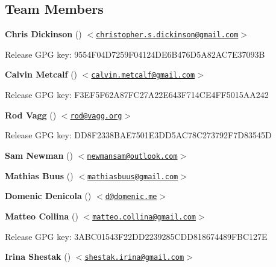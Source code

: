 \label{_members}%
 \subsection*{Team Members}


\begin{DoxyItemize}
\item {\bfseries Chris Dickinson} (\href{https://github.com/chrisdickinson}{\tt }) $<$\href{mailto:christopher.s.dickinson@gmail.com}{\tt christopher.\+s.\+dickinson@gmail.\+com}$>$
\begin{DoxyItemize}
\item Release G\+PG key\+: 9554\+F04\+D7259\+F04124\+D\+E6\+B476\+D5\+A82\+A\+C7\+E37093B
\end{DoxyItemize}
\item {\bfseries Calvin Metcalf} (\href{https://github.com/calvinmetcalf}{\tt }) $<$\href{mailto:calvin.metcalf@gmail.com}{\tt calvin.\+metcalf@gmail.\+com}$>$
\begin{DoxyItemize}
\item Release G\+PG key\+: F3\+E\+F5\+F62\+A87\+F\+C27\+A22\+E643\+F714\+C\+E4\+F\+F5015\+A\+A242
\end{DoxyItemize}
\item {\bfseries Rod Vagg} (\href{https://github.com/rvagg}{\tt }) $<$\href{mailto:rod@vagg.org}{\tt rod@vagg.\+org}$>$
\begin{DoxyItemize}
\item Release G\+PG key\+: D\+D8\+F2338\+B\+A\+E7501\+E3\+D\+D5\+A\+C78\+C273792\+F7\+D83545D
\end{DoxyItemize}
\item {\bfseries Sam Newman} (\href{https://github.com/sonewman}{\tt }) $<$\href{mailto:newmansam@outlook.com}{\tt newmansam@outlook.\+com}$>$
\item {\bfseries Mathias Buus} (\href{https://github.com/mafintosh}{\tt }) $<$\href{mailto:mathiasbuus@gmail.com}{\tt mathiasbuus@gmail.\+com}$>$
\item {\bfseries Domenic Denicola} (\href{https://github.com/domenic}{\tt }) $<$\href{mailto:d@domenic.me}{\tt d@domenic.\+me}$>$
\item {\bfseries Matteo Collina} (\href{https://github.com/mcollina}{\tt }) $<$\href{mailto:matteo.collina@gmail.com}{\tt matteo.\+collina@gmail.\+com}$>$
\begin{DoxyItemize}
\item Release G\+PG key\+: 3\+A\+B\+C01543\+F22\+D\+D2239285\+C\+D\+D818674489\+F\+B\+C127E
\end{DoxyItemize}
\item {\bfseries Irina Shestak} (\href{https://github.com/lrlna}{\tt }) $<$\href{mailto:shestak.irina@gmail.com}{\tt shestak.\+irina@gmail.\+com}$>$ 
\end{DoxyItemize}